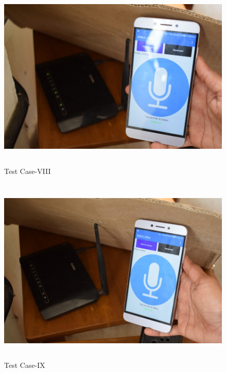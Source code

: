 \begin{figure}[H]
	
	\centering
	\includegraphics[width=\linewidth,height=9cm] {./images/p36.jpg}
	\caption{Test Case-VIII}
	\label{manual}
\end{figure}

\begin{figure}[H]
	
	\centering
	\includegraphics[width=\linewidth,height=9cm] {./images/p37.jpg}
	\caption{Test Case-IX}
	\label{manual}
\end{figure}

